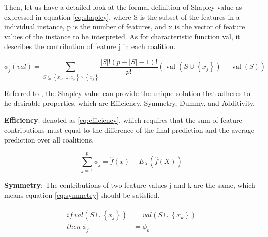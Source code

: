 Then, let us have a detailed look at the formal definition of Shapley value as expressed in equation \ref{eq:shapley}, where S is the subset of the features in a individual instance, p is the number of features, and x is the vector of feature values of the instance to be interpreted. As for characteristic function val, it describes the contribution of feature j in each coalition.




\begin{equation} \label{eq:shapley}
\phi_{j}(v a l)=\sum_{S \subseteq\left\{x_{1}, \ldots, x_{p}\right\} \backslash\left\{x_{j}\right\}} \frac{|S| !(p-|S|-1) !}{p !}\left(\operatorname{val}\left(S \cup\left\{x_{j}\right\}\right)-\operatorname{val}(S)\right)
\end{equation}

Referred to \cite{shapley1953value}, the Shapley value can provide the unique solution that adheres to he desirable properties, which are Efficiency, Symmetry, Dummy, and Additivity.

\textbf{Efficiency}: denoted as \ref*{eq:efficiency}, which requires that the sum of feature contributions must equal to the difference of the final prediction and the average prediction over all coalitions. 

\begin{equation} \label{eq:efficiency}
\sum_{j=1}^{p} \phi_{j}=\hat{f}(x)-E_{X}(\hat{f}(X))
\end{equation}

\textbf{Symmetry}: The contributions of two feature values j and k are the same, which means equation \ref{eq:symmetry} should be satisfied. 

\begin{equation} \label{eq:symmetry}
\begin{gathered}
\begin{aligned}
if \ val\left(S \cup\left\{x_{j}\right\}\right) &= val\left(S \cup\left\{x_{k}\right\}\right) \\
then \  \phi_{j} &= \phi_{k}
\end{aligned}
\end{gathered}
\end{equation}

